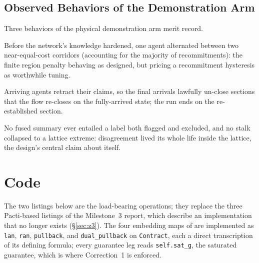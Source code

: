 \documentclass[11pt]{article}
\theoremstyle{definition}
\theoremstyle{remark}
\begin{document}
\subsection{Observed Behaviors of the Demonstration Arm}
\label{sec:app-behaviors}

Three behaviors of the physical demonstration arm merit record.
\begin{description}[leftmargin=1.6em]
\item[Early route flapping.] Before the network's knowledge hardened, one agent alternated
  between two near-equal-cost corridors (accounting for the majority of recommitments): the
  finite region penalty behaving as designed, but pricing a recommitment hysteresis as
  worthwhile tuning.
\item[End-of-run reopening.] Arriving agents retract their claims, so the final arrivals
  lawfully un-close sections that the flow re-closes on the fully-arrived state; the run ends
  on the re-established section.
\item[Region-level absorption.] No fused summary ever entailed a label both flagged and
  excluded, and no stalk collapsed to a lattice extreme: disagreement lived its whole life
  inside the lattice, the design's central claim about itself.
\end{description}

\section{Code}
\label{sec:code}

The two listings below are the load-bearing operations; they replace the three Pacti-based
listings of the Milestone~3 report, which describe an implementation that no longer exists
(\S\ref{sec:z3}).
The four embedding maps of  are implemented as \texttt{lan},
\texttt{ran}, \texttt{pullback}, and \texttt{dual\_pullback} on \texttt{Contract}, each a
direct transcription of its defining formula; every guarantee leg reads \texttt{self.sat\_g},
the saturated guarantee, which is where Correction~1 is enforced.
\end{document}
